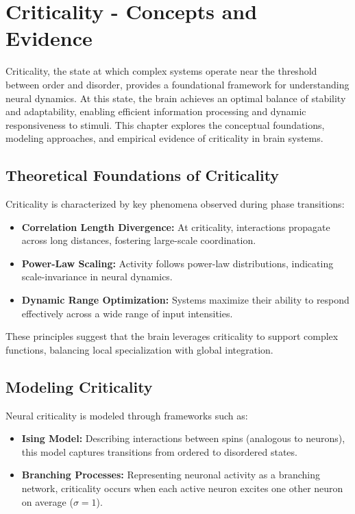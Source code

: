 
\section{Criticality - Concepts and Evidence}

Criticality, the state at which complex systems operate near the threshold between order and disorder, provides a foundational framework for understanding neural dynamics. At this state, the brain achieves an optimal balance of stability and adaptability, enabling efficient information processing and dynamic responsiveness to stimuli. This chapter explores the conceptual foundations, modeling approaches, and empirical evidence of criticality in brain systems.

\subsection*{Theoretical Foundations of Criticality}

Criticality is characterized by key phenomena observed during phase transitions:
\begin{itemize}
    \item \textbf{Correlation Length Divergence:} At criticality, interactions propagate across long distances, fostering large-scale coordination.
    \item \textbf{Power-Law Scaling:} Activity follows power-law distributions, indicating scale-invariance in neural dynamics.
    \item \textbf{Dynamic Range Optimization:} Systems maximize their ability to respond effectively across a wide range of input intensities.
\end{itemize}

These principles suggest that the brain leverages criticality to support complex functions, balancing local specialization with global integration.

\subsection*{Modeling Criticality}

Neural criticality is modeled through frameworks such as:
\begin{itemize}
    \item \textbf{Ising Model:} Describing interactions between spins (analogous to neurons), this model captures transitions from ordered to disordered states.
    \item \textbf{Branching Processes:} Representing neuronal activity as a branching network, criticality occurs when each active neuron excites one other neuron on average ($\sigma = 1$).
\end{itemize}

